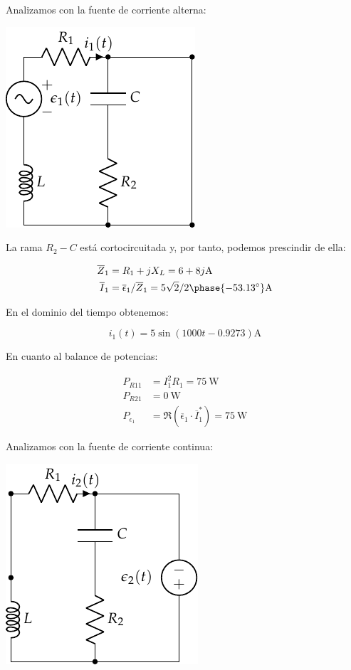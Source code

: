 Analizamos con la fuente de corriente alterna:

\begin{center}
\includegraphics{figuras/superposicion1_AC}
\end{center}

La rama $R_2 - C$ está cortocircuitada y, por tanto, podemos prescindir de ella:

\begin{align*}
  \overline{Z}_1 &= R_1 + jX_L = 6 + 8j\si{\ampere}\\
  \overline{I}_1 &= \overline{\epsilon}_1 / \overline{Z}_1 = 5\sqrt{2}/2\phase{\ang{-53.13}}\si{\ampere}
\end{align*}

En el dominio del tiempo obtenemos:

\begin{equation*}
  i_1(t) = 5\sin(1000t - 0.9273)\si{\ampere}
\end{equation*}

En cuanto al balance de potencias:

\begin{align*}
  P_{R11} &= I_1^2 R_1 = \qty{75}{\watt}\\
  P_{R21} &= \qty{0}{\watt}\\
  P_{\epsilon_1} &= \Re(\overline{\epsilon}_1 \cdot \overline{I}_1^*) = \qty{75}{\watt}
\end{align*}

Analizamos con la fuente de corriente continua:

\begin{center}
\includegraphics{figuras/superposicion1_DC}
\end{center}

